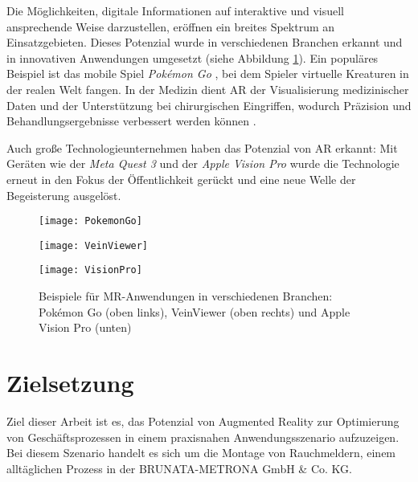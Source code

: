 Die Möglichkeiten, digitale Informationen auf interaktive und visuell ansprechende Weise darzustellen, eröffnen ein breites Spektrum an Einsatzgebieten. Dieses Potenzial wurde in verschiedenen Branchen erkannt und in innovativen Anwendungen umgesetzt (siehe Abbildung \ref{fig:MRApplications}). Ein populäres Beispiel ist das mobile Spiel \textit{Pokémon Go} \citet{wikipedia2024pokemonGo}, bei dem Spieler virtuelle Kreaturen in der realen Welt fangen. In der Medizin dient AR der Visualisierung medizinischer Daten und der Unterstützung bei chirurgischen Eingriffen, wodurch Präzision und Behandlungsergebnisse verbessert werden können \citet{chen2017medicalMR}.

Auch große Technologieunternehmen haben das Potenzial von AR erkannt: Mit Geräten wie der \textit{Meta Quest 3} und der \textit{Apple Vision Pro} wurde die Technologie erneut in den Fokus der Öffentlichkeit gerückt und eine neue Welle der Begeisterung ausgelöst. \cite{doerner2022virtual, boulanger2024applications}

\begin{figure}[h]
    \centering
    \begin{minipage}{0.45\textwidth}
        \centering
        \texttt{[image: PokemonGo]}
    \end{minipage}
    \begin{minipage}{0.45\textwidth}
        \centering
        \texttt{[image: VeinViewer]}
    \end{minipage}
    \begin{minipage}{0.45\textwidth}
        \centering
        \texttt{[image: VisionPro]}
    \end{minipage}
    \caption{Beispiele für MR-Anwendungen in verschiedenen Branchen: Pokémon Go (oben links), VeinViewer (oben rechts) und Apple Vision Pro (unten) \cite{wikipedia2024pokemonGo, chen2017medicalMR, apple2023visionPro}}
    \label{fig:MRApplications}
\end{figure}

\section{Zielsetzung}

Ziel dieser Arbeit ist es, das Potenzial von Augmented Reality zur Optimierung von Geschäftsprozessen in einem praxisnahen Anwendungsszenario aufzuzeigen. Bei diesem Szenario handelt es sich um die Montage von Rauchmeldern, einem alltäglichen Prozess in der BRUNATA-METRONA GmbH \& Co. KG.

